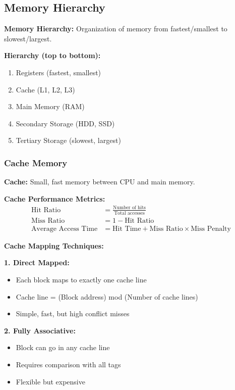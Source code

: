\documentclass[11pt,a4paper]{article}
\begin{document}
\subsection{Memory Hierarchy}

\begin{defbox}
\textbf{Memory Hierarchy:} Organization of memory from fastest/smallest to slowest/largest.
\end{defbox}

\textbf{Hierarchy (top to bottom):}
\begin{enumerate}
    \item Registers (fastest, smallest)
    \item Cache (L1, L2, L3)
    \item Main Memory (RAM)
    \item Secondary Storage (HDD, SSD)
    \item Tertiary Storage (slowest, largest)
\end{enumerate}

\subsubsection{Cache Memory}

\begin{defbox}
\textbf{Cache:} Small, fast memory between CPU and main memory.
\end{defbox}

\textbf{Cache Performance Metrics:}
\begin{align*}
    \text{Hit Ratio} &= \frac{\text{Number of hits}}{\text{Total accesses}} \\
    \text{Miss Ratio} &= 1 - \text{Hit Ratio} \\
    \text{Average Access Time} &= \text{Hit Time} + \text{Miss Ratio} \times \text{Miss Penalty}
\end{align*}

\textbf{Cache Mapping Techniques:}

\textbf{1. Direct Mapped:}
\begin{itemize}
    \item Each block maps to exactly one cache line
    \item Cache line = (Block address) mod (Number of cache lines)
    \item Simple, fast, but high conflict misses
\end{itemize}

\textbf{2. Fully Associative:}
\begin{itemize}
    \item Block can go in any cache line
    \item Requires comparison with all tags
    \item Flexible but expensive
\end{itemize}
\end{document}
